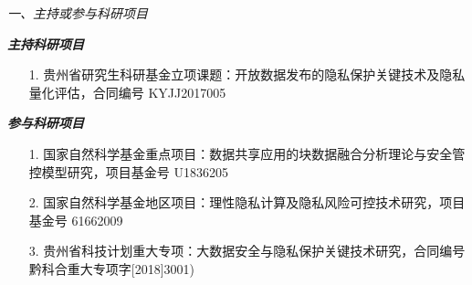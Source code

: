 \documentclass[pdftex,notypeinfo,twoside,openany,UTF8,fntef]{CASthesis}
\numberwithin{algorithm}{chapter}
\theoremstyle{THrm}{
	\newtheorem{question}{问题}[section]
    \newtheorem{problem}{问题}[section]
	\newtheorem{property}{性质}[section]
	\newtheorem{assumption}{假设}[section]
	\newtheorem{claim}[lemma]{断言}
}
\begin{document}
\begin{resumesection}{\em {一、主持或参与科研项目}}

\textbf{{\em 主持科研项目}}
\begin{itemize}[leftmargin=1.5em]
\item [1.]贵州省研究生科研基金立项课题：开放数据发布的隐私保护关键技术及隐私量化评估，合同编号 KYJJ2017005
\end{itemize}


\textbf{{\em 参与科研项目}}
\begin{itemize}[leftmargin=1.5em]
\item [1.]国家自然科学基金重点项目：数据共享应用的块数据融合分析理论与安全管控模型研究，项目基金号 U1836205
\item [2.]国家自然科学基金地区项目：理性隐私计算及隐私风险可控技术研究，项目基金号 61662009
\item [3.]贵州省科技计划重大专项：大数据安全与隐私保护关键技术研究，合同编号黔科合重大专项字[2018]3001)
\end{itemize}

\end{resumesection}

%
\end{document}

